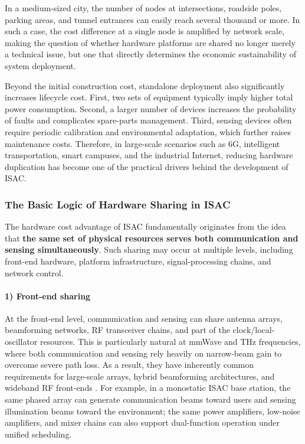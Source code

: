 In a medium-sized city, the number of nodes at intersections, roadside poles, parking areas, and tunnel entrances can easily reach several thousand or more. In such a case, the cost difference at a single node is amplified by network scale, making the question of whether hardware platforms are shared no longer merely a technical issue, but one that directly determines the economic sustainability of system deployment.

Beyond the initial construction cost, standalone deployment also significantly increases lifecycle cost. First, two sets of equipment typically imply higher total power consumption. Second, a larger number of devices increases the probability of faults and complicates spare-parts management. Third, sensing devices often require periodic calibration and environmental adaptation, which further raises maintenance costs. Therefore, in large-scale scenarios such as 6G, intelligent transportation, smart campuses, and the industrial Internet, reducing hardware duplication has become one of the practical drivers behind the development of ISAC.

\subsubsection{The Basic Logic of Hardware Sharing in ISAC}
\label{subsubsec:ch1-isac-core value-hardware-sharing}

The hardware cost advantage of ISAC fundamentally originates from the idea that \textbf{the same set of physical resources serves both communication and sensing simultaneously}. Such sharing may occur at multiple levels, including front-end hardware, platform infrastructure, signal-processing chains, and network control.

\paragraph{1) Front-end sharing}
At the front-end level, communication and sensing can share antenna arrays, beamforming networks, RF transceiver chains, and part of the clock/local-oscillator resources. This is particularly natural at mmWave and THz frequencies, where both communication and sensing rely heavily on narrow-beam gain to overcome severe path loss. As a result, they have inherently common requirements for large-scale arrays, hybrid beamforming architectures, and wideband RF front-ends \cite{Zhang2021ISAC6G, Wei2023Integrated}.  
For example, in a monostatic ISAC base station, the same phased array can generate communication beams toward users and sensing illumination beams toward the environment; the same power amplifiers, low-noise amplifiers, and mixer chains can also support dual-function operation under unified scheduling.

